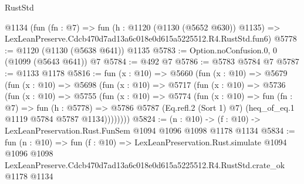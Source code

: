 \begin{lexlean}{RustStd}
\begin{coremodule}
    @1134
    (fun (fn : @7) =>
    fun (h : @1120 (@1130 (@5652 @630)) @1135) =>
    LexLeanPreserve.Cdcb470d7ad13a6c018e0d615a5225512.R4.RustStd.fun6)
@5778 := @1120 (@1130 (@5638 @641)) @1135
@5783 := Option.noConfusion.{0, 0} (@1099 (@5643 @641)) @7
@5784 := @492 @7
@5786 := @5783 @5784 @7
@5787 := @1133 @1178
@5816 := fun (x : @10) =>
  @5660
    (fun (x : @10) =>
    @5679
      (fun (x : @10) =>
      @5698
        (fun (x : @10) =>
        @5717
          (fun (x : @10) =>
          @5736
            (fun (x : @10) =>
            @5755
              (fun (x : @10) =>
              @5774
                (fun (x : @10) =>
                fun (fn : @7) =>
                fun (h : @5778) =>
                @5786 @5787 (Eq.refl.{2} (Sort 1) @7) (heq_of_eq.{1} @1119 @5784 @5787 @1134))))))))
@5824 := (n : @10) -> (f : @10) -> LexLeanPreservation.Rust.FunSem @1094 @1096 @1098 @1178 @1134
@5834 := fun (n : @10) =>
  fun (f : @10) =>
  LexLeanPreservation.Rust.simulate
    @1094
    @1096
    @1098
    LexLeanPreserve.Cdcb470d7ad13a6c018e0d615a5225512.R4.RustStd.crate_ok
    @1178
    @1134
\end{coremodule}
\end{lexlean}
